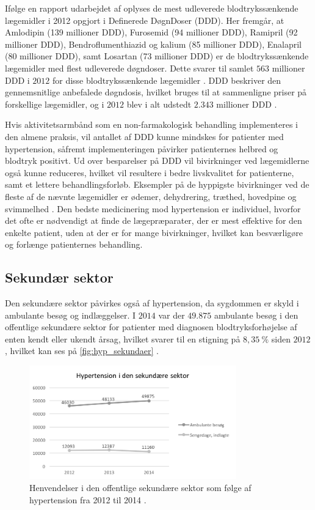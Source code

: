 Ifølge en rapport udarbejdet af \citeauthor{apotekerforeningen2012} oplyses de mest udleverede blodtrykssænkende lægemidler i 2012 opgjort i Definerede DøgnDoser (DDD). Her fremgår, at Amlodipin (139 millioner DDD), Furosemid (94 millioner DDD), Ramipril (92 millioner DDD), Bendroflumenthiazid og kalium (85 millioner DDD), Enalapril (80 millioner DDD), samt Losartan (73 millioner DDD) er de blodtrykssænkende lægemidler med flest udleverede døgndoser. Dette svarer til samlet $563$ millioner DDD i $2012$ for disse blodtrykssænkende lægemidler \citep{apotekerforeningen2012}. DDD beskriver den gennemsnitlige anbefalede døgndosis, hvilket bruges til at sammenligne priser på forskellige lægemidler, og i $2012$ blev i alt udstedt $2.343$ millioner DDD \citep{medicinoekonomi2015}. 

Hvis aktivitetsarmbånd som en non-farmakologisk  behandling implementeres i den almene praksis, vil antallet af DDD kunne mindskes for patienter med hypertension, såfremt implementeringen påvirker patienternes helbred og blodtryk positivt. Ud over besparelser på DDD vil bivirkninger ved lægemidlerne også kunne reduceres, hvilket vil resultere i bedre livskvalitet for patienterne, samt et lettere behandlingsforløb. Eksempler på de hyppigste bivirkninger ved de fleste af de nævnte lægemidler er ødemer, dehydrering, træthed, hovedpine og svimmelhed \citep{olsen2015}. Den bedste medicinering mod hypertension er individuel, hvorfor det ofte er nødvendigt at finde de lægepræparater, der er mest effektive for den enkelte patient, uden at der er for mange bivirkninger, hvilket kan besværligøre og forlænge patienternes behandling.

\subsection{Sekundær sektor}
Den sekundære sektor påvirkes også af hypertension, da sygdommen er skyld i ambulante besøg og indlæggelser. I $2014$ var der $49.875$ ambulante besøg i den offentlige sekundære sektor for patienter med diagnosen blodtryksforhøjelse af enten kendt eller ukendt årsag, hvilket svarer til en stigning på $8,35~\%$ siden $2012$, hvilket kan ses på \autoref{fig:hyp_sekundaer} \citep{sundhedsdatastyrelsen2016}. 

\begin{figure}[H]
\centering
\includegraphics[width=0.8\textwidth]{figures/hyp_sekundaer}
\caption{Henvendelser i den offentlige sekundære sektor som følge af hypertension fra 2012 til 2014 \citep{sundhedsdatastyrelsen2016}.}
\label{fig:hyp_sekundaer}
\end{figure}

